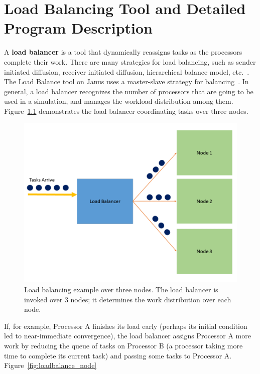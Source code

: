\chapter{Load Balancing Tool and Detailed Program
  Description}\label{lbdetails}
A \textbf{load balancer} is a tool that dynamically reassigns tasks as the
processors complete their work. There are many strategies for load
balancing, such as sender initiated diffusion, receiver initiated
diffusion, hierarchical balance model, etc.~\cite{dlb}. The Load
Balance tool on Janus uses a master-slave strategy for
balancing~\cite{janus}. In general, a load balancer recognizes the
number of processors that are going to be used in a simulation, and manages
the workload distribution among
them. Figure~\ref{fig:loadbalance_overall} demonstrates the load
balancer coordinating tasks over three nodes. 
\begin{figure}[htp]
\caption[Load balancing example]{Load balancing example over
  three nodes. The load balancer is invoked over 3 nodes; it determines
the work distribution over each node.}\label{fig:loadbalance_overall}
	\begin{center}
          \includegraphics[scale=0.35]{figs/loadbalance_overall.png}
	\end{center}
\end{figure}
If, for example, Processor A finishes its load early
(perhaps its initial condition led to near-immediate convergence),
the load balancer assigns Processor A more work by reducing the
queue of tasks on Processor B (a processor taking more time to complete its
current task) and passing some tasks to Processor A. Figure~\ref{fig:loadbalance_node}
